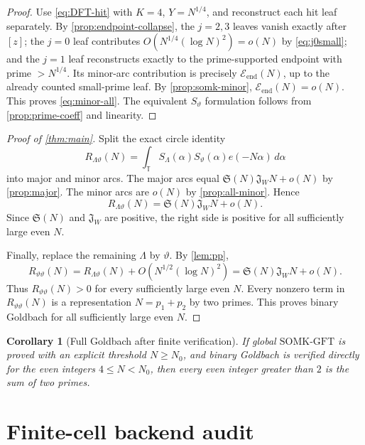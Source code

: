 \documentclass[11pt]{article}
\newtheorem{corollary}[theorem]{Corollary}
\theoremstyle{definition}
\theoremstyle{remark}
\newcommand{\T}{\mathbb T}
\newcommand{\1}{\mathbf 1}
\newcommand{\SG}{\mathfrak S}
\newcommand{\Jw}{\mathfrak J_W}
\newcommand{\SOMK}{\mathrm{SOMK}\text{-}\mathrm{GFT}}
\newcommand{\Eend}{\mathcal E_{\mathrm{end}}}
\begin{document}
\begin{proof}
Use \eqref{eq:DFT-hit} with \(K=4\), \(Y=N^{1/4}\), and reconstruct each hit leaf separately.  By \cref{prop:endpoint-collapse}, the \(j=2,3\) leaves vanish exactly after \([z]\); the \(j=0\) leaf contributes \(O(N^{1/4}(\log N)^2)=o(N)\) by \eqref{eq:j0small}; and the \(j=1\) leaf reconstructs exactly to the prime-supported endpoint with prime \(>N^{1/4}\).  Its minor-arc contribution is precisely \(\Eend(N)\), up to the already counted small-prime leaf.  By \cref{prop:somk-minor}, \(\Eend(N)=o(N)\).  This proves \eqref{eq:minor-all}.  The equivalent \(S_\vartheta\) formulation follows from \cref{prop:prime-coeff} and linearity.
\end{proof}

\begin{proof}[Proof of \cref{thm:main}]
Split the exact circle identity
\[
 R_{\Lambda\vartheta}(N)
 =\int_\T S_\Lambda(\alpha)S_\vartheta(\alpha)e(-N\alpha)\,d\alpha
\]
into major and minor arcs.  The major arcs equal \(\SG(N)\Jw N+o(N)\) by \cref{prop:major}.  The minor arcs are \(o(N)\) by \cref{prop:all-minor}.  Hence
\begin{equation}\label{eq:RLtheta-asymp}
 R_{\Lambda\vartheta}(N)=\SG(N)\Jw N+o(N).
\end{equation}
Since \(\SG(N)\) and \(\Jw\) are positive, the right side is positive for all sufficiently large even \(N\).

Finally, replace the remaining \(\Lambda\) by \(\vartheta\).  By \cref{lem:pp},
\[
 R_{\vartheta\vartheta}(N)
 =R_{\Lambda\vartheta}(N)
 +O\!\left(N^{1/2}(\log N)^2\right)
 =\SG(N)\Jw N+o(N).
\]
Thus \(R_{\vartheta\vartheta}(N)>0\) for every sufficiently large even \(N\).  Every nonzero term in \(R_{\vartheta\vartheta}(N)\) is a representation \(N=p_1+p_2\) by two primes.  This proves binary Goldbach for all sufficiently large even \(N\).
\end{proof}

\begin{corollary}[Full Goldbach after finite verification]\label{cor:finite}
If global \(\SOMK\) is proved with an explicit threshold \(N\ge N_0\), and binary Goldbach is verified directly for the even integers \(4\le N<N_0\), then every even integer greater than \(2\) is the sum of two primes.
\end{corollary}

\section{Finite-cell backend audit}\label{sec:cell-audit}
\end{document}

